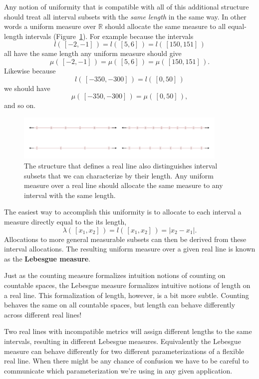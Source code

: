 \documentclass[
  letterpaper,
  DIV=11,
  numbers=noendperiod]{scrartcl}
\begin{document}
Any notion of uniformity that is compatible with all of this additional
structure should treat all interval subsets with the \emph{same length}
in the same way. In other words a uniform measure over \(\mathbb{R}\)
should allocate the same measure to all equal-length intervals
(Figure~\ref{fig-equal-length-intervals}). For example because the
intervals \[
l( \, [-2, -1] \, ) = l( \, [5, 6] \, ) = l( \, [150, 151] \,)
\] all have the same length any uniform measure should give \[
\mu( \, [-2, -1] \, ) = \mu( \, [5, 6] \, ) = \mu( \, [150, 151] \, ).
\] Likewise because \[
l( \, [-350, -300] \, ) = l( \, [0, 50] \, )
\] we should have \[
\mu( \, [-350, -300] \, ) = \mu( \, [0, 50] \,),
\] and so on.

\begin{figure}

{\centering \includegraphics[width=0.9\textwidth,height=\textheight]{figures/interval_partitions/interval_partitions.pdf}

}

\caption{\label{fig-equal-length-intervals}The structure that defines a
real line also distinguishes interval subsets that we can characterize
by their length. Any uniform measure over a real line should allocate
the same measure to any interval with the same length.}

\end{figure}

The easiest way to accomplish this uniformity is to allocate to each
interval a measure directly equal to the its length, \[
\lambda( \, [x_{1}, x_{2}] \, )
= l( \, [x_{1}, x_{2}] \, )
= | x_{2} - x_{1} |.
\] Allocations to more general measurable subsets can then be derived
from these interval allocations. The resulting uniform measure over a
given real line is known as the \textbf{Lebesgue measure}.

Just as the counting measure formalizes intuition notions of counting on
countable spaces, the Lebesgue measure formalizes intuitive notions of
length on a real line. This formalization of length, however, is a bit
more subtle. Counting behaves the same on all countable spaces, but
length can behave differently across different real lines!

Two real lines with incompatible metrics will assign different lengths
to the same intervals, resulting in different Lebesgue measures.
Equivalently the Lebesgue measure can behave differently for two
different parameterizations of a flexible real line. When there might be
any chance of confusion we have to be careful to communicate which
parameterization we're using in any given application.
\end{document}
